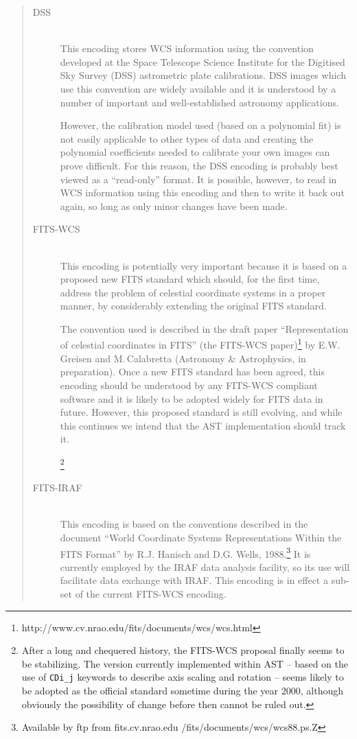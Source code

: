 \documentclass[twoside,11pt]{article}
\newcommand{\htmladdnormallinkfoot}[2]{#1\footnote{#2}}
\begin{document}
\begin{quote}
\begin{description}
\item[DSS]\mbox{}\\
This encoding stores WCS information using the convention developed at
the Space Telescope Science Institute for the Digitised Sky Survey
(DSS) astrometric plate calibrations.  DSS images which use this
convention are widely available and it is understood by a number of
important and well-established astronomy applications.

However, the calibration model used (based on a polynomial fit) is not
easily applicable to other types of data and creating the polynomial
coefficients needed to calibrate your own images can prove
difficult. For this reason, the DSS encoding is probably best viewed
as a ``read-only'' format. It is possible, however, to read in WCS
information using this encoding and then to write it back out again,
so long as only minor changes have been made.

\item[FITS-WCS]\mbox{}\\
This encoding is potentially very important because it is based on a
proposed new FITS standard which should, for the first time, address
the problem of celestial coordinate systems in a proper manner, by
considerably extending the original FITS standard.

The convention used is described in the draft paper ``Representation
of celestial coordinates in FITS'' \htmladdnormallinkfoot{(the
FITS-WCS paper)}{http://www.cv.nrao.edu/fits/documents/wcs/wcs.html}
by E.W.\,Greisen and M.\,Calabretta (Astronomy \& Astrophysics, in
preparation). Once a new FITS standard has been agreed, this encoding
should be understood by any FITS-WCS compliant software and it is
likely to be adopted widely for FITS data in future.  However, this
proposed standard is still evolving, and while this continues we
intend that the AST implementation should track it.

\footnote{After a long and chequered history, the FITS-WCS proposal 
finally seems to be stabilizing. The version currently implemented within
AST -- based on the use of {\tt CDi\_j} keywords to describe axis scaling
and rotation -- seems likely to be adopted as the official standard
sometime during the year 2000, although obviously the possibility of
change before then cannot be ruled out.}

\item[FITS-IRAF]\mbox{}\\
This encoding is based on the conventions described in the document
``World Coordinate Systems Representations Within the FITS Format'' by R.J.
Hanisch and D.G. Wells, 1988.\footnote{Available by ftp from
fits.cv.nrao.edu /fits/documents/wcs/wcs88.ps.Z} It is currently employed
by the IRAF data analysis facility, so its use will facilitate data
exchange with IRAF. This encoding is in effect a sub-set of the current
FITS-WCS encoding.


\end{description}
\end{quote}
\end{document}
